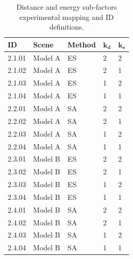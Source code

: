 \begin{table}[!t]
\centering
\footnotesize
\caption{Distance and energy sub-factors experimental mapping and ID definitions.}
\label{tab:distance_energy_params}
\begin{tabular}{@{}lllll@{}}
\hline
    \textbf{ID} & \textbf{Scene} & \textbf{Method} & $\bm{k_{\text{d}}}$ & $\bm{k_{\text{e}}}$ \\
\hline
    2.1.01 & Model A & ES & 2 & 2 \\
    2.1.02 & Model A & ES & 2 & 1 \\
    2.1.03 & Model A & ES & 1 & 2 \\
    2.1.04 & Model A & ES & 1 & 1 \\
    \noalign{\smallskip}
    2.2.01 & Model A & SA & 2 & 2 \\
    2.2.02 & Model A & SA & 2 & 1 \\
    2.2.03 & Model A & SA & 1 & 2 \\
    2.2.04 & Model A & SA & 1 & 1 \\
    \noalign{\smallskip}
    2.3.01 & Model B & ES & 2 & 2 \\
    2.3.02 & Model B & ES & 2 & 1 \\
    2.3.03 & Model B & ES & 1 & 2 \\
    2.3.04 & Model B & ES & 1 & 1 \\
    \noalign{\smallskip}
    2.4.01 & Model B & SA & 2 & 2 \\
    2.4.02 & Model B & SA & 2 & 1 \\
    2.4.03 & Model B & SA & 1 & 2 \\
    2.4.04 & Model B & SA & 1 & 1 \\
\hline
\end{tabular}
\end{table}